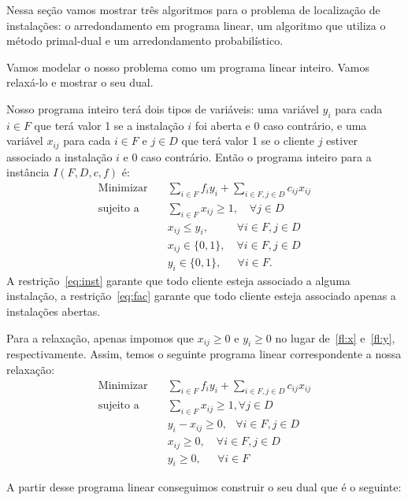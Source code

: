 Nessa seção vamos mostrar três algoritmos para o problema de localização de instalações: o arredondamento em programa linear, um algoritmo que utiliza o método primal-dual e um arredondamento probabilístico.

Vamos modelar o nosso problema como um programa linear inteiro. Vamos relaxá-lo e mostrar o seu dual.

Nosso programa inteiro terá dois tipos de variáveis: uma variável $y_i$ para cada $i \in F$ que terá valor 1 se a instalação $i$ foi aberta e 0 caso contrário, e uma variável $x_{ij}$ para cada $i \in F$ e $j \in D$ que terá valor 1 se o cliente $j$ estiver associado a instalação $i$ e 0 caso contrário. Então o programa inteiro para a instância $I(F,D,c,f)$ é:
\begin{align}
 \text{Minimizar} \quad & \sum_{i \in F}f_iy_i + \sum_{i\in F,j\in D}c_{ij}x_{ij} \nonumber \\
 \text{sujeito a} \quad & \sum_{i\in F} x_{ij}\geq1, \quad \forall j \in D \label{eq:inst}\\
 &x_{ij} \leq y_i,\quad \quad \; \; \forall i\in F,j\in D \label{eq:fac} \\
 &x_{ij} \in \{0,1\} ,\quad \forall i\in F,j\in D \label{fl:x}\\
 &y_i \in \{0,1\}, \quad \; \,\forall i\in F \label{fl:y}.
\end{align}
A restrição~\eqref{eq:inst} garante que todo cliente esteja associado a alguma instalação, a restrição~\eqref{eq:fac} garante que todo cliente esteja associado apenas a instalações abertas.

Para a relaxação, apenas impomos que $x_{ij} \geq 0$ e $y_i \geq 0$ no lugar de~\eqref{fl:x} e~\eqref{fl:y}, respectivamente. Assim, temos o seguinte programa linear correspondente a nossa relaxação:
    \begin{align}
        \text{Minimizar} \quad & \sum_{i \in F}f_iy_i + \sum_{i\in F,j\in D}c_{ij}x_{ij} \tag{P1} \label{P1}\\
        \text{sujeito a} \quad & \sum_{i\in F} x_{ij}\geq1,  \forall j \in D \tag{P2} \label{P2}\\
        &y_i - x_{ij} \geq 0, \, \; \; \forall i\in F,j\in D \tag{P3} \label{P3}\\
        &x_{ij} \geq 0,\quad \forall i\in F,j\in D\tag{P4}\label{P4}\\
        &y_i \geq 0, \quad \; \,\forall i\in F \tag{P5} \label{P5}
       \end{align}

    A partir desse programa linear conseguimos construir o seu dual que é o seguinte:

